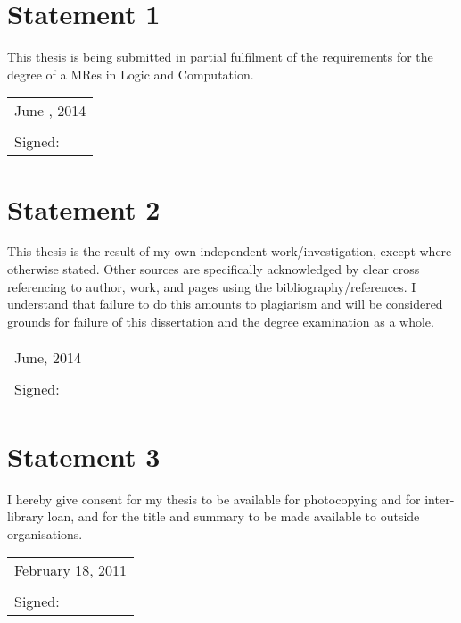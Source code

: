 \documentclass[11pt, a4paper, twoside, openright]{book}
\begin{document}
\section*{Statement 1}
This thesis is being submitted in partial fulfilment of the
requirements for the degree of a MRes in Logic and Computation.

\vspace{0.5cm}
\begin{tabular}{l}
June , 2014\\
\\
Signed:
\end{tabular}

\section*{Statement 2}

This thesis is the result of my own independent
work/investigation, except where otherwise stated. Other sources are
specifically acknowledged by clear cross referencing to author, work,
and pages using the bibliography/references. I understand that failure
to do this amounts to plagiarism and will be considered grounds for
failure of this dissertation and the degree examination as a whole.

\vspace{0.5cm}
\begin{tabular}{l}
June, 2014\\
\\
Signed:
\end{tabular}

\section*{Statement 3}

I hereby give consent for my thesis to be available for
photocopying and for inter-library loan, and for the title and summary
to be made available to outside organisations.

\vspace{0.5cm}
\begin{tabular}{l}
February 18, 2011\\
\\
Signed:
\end{tabular}

\clearpage
\thispagestyle{empty}
\mbox{}

\newpage

\tableofcontents


\clearpage






















\end{document}
